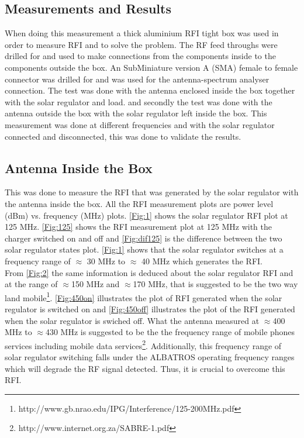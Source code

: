 \documentclass[12pt,a4paper]{report}
\begin{document}
\subsection{Measurements and Results}
When doing this measurement a thick aluminium RFI tight box was used in order to measure RFI and to solve the problem. The RF feed throughs were drilled for and used to make connections from the components inside to the components outside the box. An SubMiniature version A (SMA) female to female connector was drilled for and was used for the antenna-spectrum analyser connection. The test was done with the antenna enclosed inside the box together with the solar regulator and load. and secondly the test was done with the antenna outside the box with the solar regulator left inside the box. This measurement was done at different frequencies and with the solar regulator connected and disconnected, this was done to validate the results. 

\subsection{Antenna Inside the Box}
This was done to measure the RFI that was generated by the solar regulator with the antenna inside the box. All the RFI measurement plots are power level (dBm) vs. frequency (MHz) plots. \autoref{Fig:1} shows the solar regulator RFI plot at 125 MHz. \autoref{Fig:125} shows the RFI measurement plot at 125 MHz with the charger switched on and off and \autoref{Fig:dif125} is the difference between the two solar regulator states plot. \autoref{Fig:1} shows that the solar regulator switches at a frequency range of $\approx$ 30 MHz to $\approx$ 40 MHz which generates the RFI. \\

From \autoref{Fig:2} the same information is deduced about the solar regulator RFI and at the range of $\approx$150 MHz and $\approx$170 MHz, that is suggested to be the two way land mobile\footnote{http://www.gb.nrao.edu/IPG/Interference/125-200MHz.pdf}. \autoref{Fig:450on} illustrates the plot of RFI generated when the solar regulator is switched on and \autoref{Fig:450off} illustrates the plot of the RFI generated when the solar regulator is swiched off. What the antenna measured at $\approx$400 MHz to $\approx$430 MHz is suggested to be the the frequency range of mobile phones services including mobile data services\footnote{http://www.internet.org.za/SABRE-1.pdf}. Additionally, this frequency range of solar regulator switching falls under the ALBATROS operating frequency ranges which will degrade the RF signal detected. Thus, it is crucial to overcome this RFI.
\end{document}
